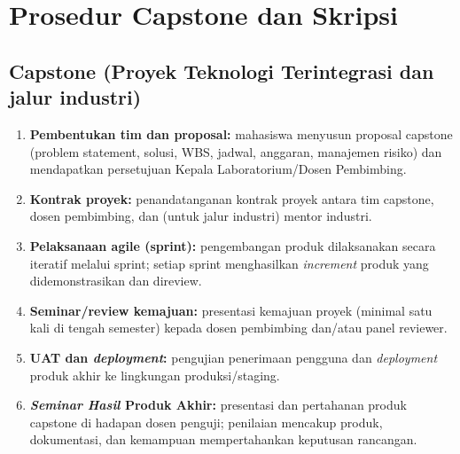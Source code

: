 \documentclass[12pt,a4paper]{report}
\begin{document}
\section{Prosedur Capstone dan Skripsi}

\subsection*{Capstone (Proyek Teknologi Terintegrasi dan jalur industri)}
\begin{enumerate}
\item \textbf{Pembentukan tim dan proposal:} mahasiswa menyusun proposal capstone (problem statement, solusi, WBS, jadwal, anggaran, manajemen risiko) dan mendapatkan persetujuan Kepala Laboratorium/Dosen Pembimbing.
\item \textbf{Kontrak proyek:} penandatanganan kontrak proyek antara tim capstone, dosen pembimbing, dan (untuk jalur industri) mentor industri.
\item \textbf{Pelaksanaan agile (sprint):} pengembangan produk dilaksanakan secara iteratif melalui sprint; setiap sprint menghasilkan \emph{increment} produk yang didemonstrasikan dan direview.
\item \textbf{Seminar/review kemajuan:} presentasi kemajuan proyek (minimal satu kali di tengah semester) kepada dosen pembimbing dan/atau panel reviewer.
\item \textbf{UAT dan \emph{deployment}:} pengujian penerimaan pengguna dan \emph{deployment} produk akhir ke lingkungan produksi/staging.
\item \textbf{\emph{Seminar Hasil} Produk Akhir:} presentasi dan pertahanan produk capstone di hadapan dosen penguji; penilaian mencakup produk, dokumentasi, dan kemampuan mempertahankan keputusan rancangan.
\end{enumerate}
\end{document}
